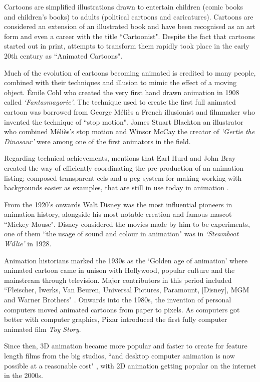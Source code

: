 \documentclass[report, 11pt, oneside]{dissertation}
\begin{document}
Cartoons are simplified illustrations drawn to entertain children (comic books and children's books) to adults (political cartoons and caricatures). Cartoons are considered an extension of an illustrated book and have been recognised as an art form and even a career with the title ``Cartoonist". Despite the fact that cartoons started out in print, attempts to transform them rapidly took place in the early 20th century as ``Animated Cartoons".

Much of the evolution of cartoons becoming animated is credited to many people, combined with their techniques and illusion to mimic the effect of a moving object. \'{E}mile Cohl who created the very first hand drawn animation in 1908 called \textit{`Fantasmagorie'}. The technique used to create the first full animated cartoon was borrowed from George M\'{e}li\`{e}s a French illusionist and filmmaker who invented the technique of ``stop motion". James Stuart Blackton an illustrator who combined M\'{e}li\`{e}s's stop motion and Winsor McCay the creator of \textit{`Gertie the Dinosaur'} were among one of the first animators in the field.

Regarding technical achievements, \citeauthor{yu2013modern} mentions that Earl Hurd and John Bray created the way of efficiently coordinating the pre-production of an animation listing; composed transparent cels and a peg system for making working with backgrounds easier as examples, that are still in use today in animation \citeyearpar[107]{yu2013modern}. 

From the 1920's onwards Walt Disney was the most influential pioneers in animation history, alongside his most notable creation and famous mascot ``Mickey Mouse". Disney considered the movies made by him to be experiments, one of them ``the usage of sound and colour in animation" \citep{yu2013modern} was in \textit{`Steamboat Willie'} in 1928.

Animation historians marked the 1930s as the `Golden age of animation' where animated cartoon came in unison with Hollywood, popular culture and the mainstream through television. Major contributors in this period included ``Fleischer, Iwerks, Van Beuren, Universal Pictures, Paramount, [Disney], MGM and Warner Brothers" \citep{yu2013modern}. Onwards into the 1980s, the invention of personal computers moved animated cartoons from paper to pixels. As computers got better with computer graphics, Pixar introduced the first fully computer animated film \textit{Toy Story}.

Since then, 3D animation became more popular and faster to create for feature length films from the big studios,  ``and desktop computer animation is now possible at a reasonable cost" \citep{yu2013modern}, with 2D animation getting popular on the internet in the 2000s.
\end{document}
